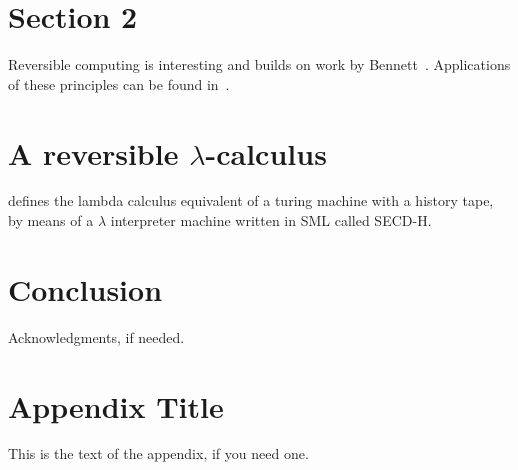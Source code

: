 \documentclass[10pt]{sigplanconf}
\begin{document}
\section{Section 2}
Reversible computing is interesting and builds on work by
Bennett~\cite{Bennett:1982}. Applications of these principles can be found
in~\cite{ThomsenAxelsen:2009:PPL,YokoyamaGlueck:2007:Janus}.


\section{A reversible $\lambda$-calculus}
\cite{huelsbergen1996logically} defines the lambda calculus equivalent of a
turing machine with a history tape, by means of a $\lambda$ interpreter machine written in SML called SECD-H.


\section{Conclusion}




\acks
Acknowledgments, if needed.






\appendix
\section{Appendix Title}

This is the text of the appendix, if you need one.
\end{document}
